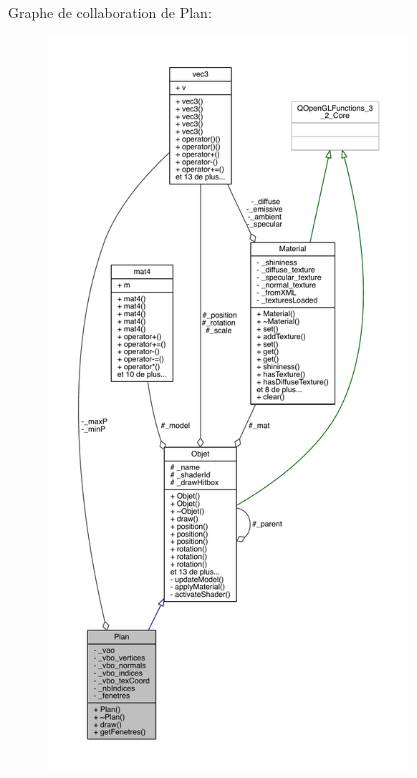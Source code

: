 Graphe de collaboration de Plan\+:
\nopagebreak
\begin{figure}[H]
\begin{center}
\leavevmode
\includegraphics[height=550pt]{class_plan__coll__graph}
\end{center}
\end{figure}
